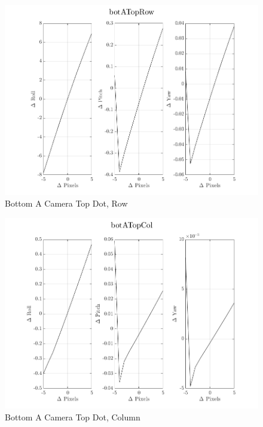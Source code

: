 \documentclass[12pt]{article}
\begin{document}
\begin{multicols}{2}
\begin{figure}[H]
	\includegraphics[width=0.9\columnwidth]{botATopRow.png}
	\caption{Bottom A Camera Top Dot, Row\label{fig:botATopRow}}
\end{figure}

\begin{figure}[H]
	\includegraphics[width=0.9\columnwidth]{botATopCol.png}
	\caption{Bottom A Camera Top Dot, Column\label{fig:botATopCol}}
\end{figure}


\end{multicols}
\end{document}
